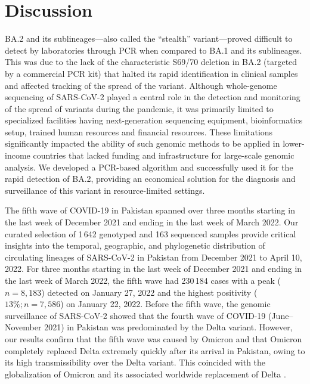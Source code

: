 \section{Discussion}\label{sec-disc}
BA.2 and its sublineages---also called the ``stealth'' variant---proved difficult to detect by laboratories through PCR when compared to BA.1 and its sublineages.
This was due to the lack of the characteristic S69/70 deletion in BA.2 (targeted by a commercial PCR kit) that halted its rapid identification in clinical samples and affected tracking of the spread of the variant.
Although whole-genome sequencing of SARS-CoV-2 played a central role in the detection and monitoring of the spread of variants during the pandemic, it was primarily limited to specialized facilities having next-generation sequencing equipment, bioinformatics setup, trained human resources and financial resources. These limitations significantly impacted the ability of such genomic methods to be applied in lower-income countries that lacked funding and infrastructure for large-scale genomic analysis.
We developed a PCR-based algorithm and successfully used it for the rapid detection of BA.2, providing an economical solution for the diagnosis and surveillance of this variant in resource-limited settings.

The fifth wave of COVID-19 in Pakistan spanned over three months starting in the last week of December 2021 and ending in the last week of March 2022.
Our curated selection of 1\,642 genotyped and 163 sequenced samples provide critical insights into the temporal, geographic, and phylogenetic distribution of circulating lineages of SARS-CoV-2 in Pakistan from December 2021 to April 10, 2022.
For three months starting in the last week of December 2021 and ending in the last week of March 2022, the fifth wave had 230\,184 cases with a peak ($n=8,183$) detected on January 27, 2022 and the highest positivity ($13\%; n=7,586$) on January 22, 2022.
Before the fifth wave, the genomic surveillance of SARS-CoV-2 showed that the fourth wave of COVID-19 (June--November 2021) in Pakistan was predominated by the Delta variant. However, our results confirm that the fifth wave was caused by Omicron and that Omicron completely replaced Delta extremely quickly after its arrival in Pakistan, owing to its high transmissibility over the Delta variant.
This coincided with the globalization of Omicron and its associated worldwide replacement of Delta \citep{mohapatra2022twin, mohapatra2022Omicron}.

